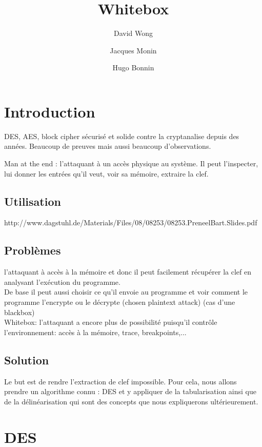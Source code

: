 \documentclass[a4paper,12pt]{article}
\author{David Wong
  \and Jacques Monin
  \and Hugo Bonnin}
\title{Whitebox}
\begin{document}
\maketitle
\newpage
\tableofcontents
\newpage


\section{Introduction}

DES, AES, block cipher sécurisé et solide contre la cryptanalise depuis des années. Beaucoup de preuves mais aussi beaucoup d'observations.

Man at the end : l'attaquant à un accès physique au système. Il peut l'inspecter, lui donner les entrées qu'il veut, voir sa mémoire, extraire la clef.
	
\subsection{Utilisation}

http://www.dagstuhl.de/Materials/Files/08/08253/08253.PreneelBart.Slides.pdf

\subsection{Problèmes}

l'attaquant à accès à la mémoire et donc il peut facilement récupérer la clef en analysant l'exécution du programme.\\
De base il peut aussi choisir ce qu'il envoie au programme et voir comment le programme l'encrypte ou le décrypte (chosen plaintext attack) (cas d'une blackbox)\\
Whitebox: l'attaquant a encore plus de possibilité puisqu'il contrôle l'environnement: accès à la mémoire, trace, breakpoints,...

\subsection{Solution}

Le but est de rendre l'extraction de clef impossible. Pour cela, nous allons prendre un algorithme connu : DES et y appliquer de la tabularisation ainsi que de la délinéarisation qui sont des concepts que nous expliquerons ultérieurement.

\newpage
	
\section{DES}
\end{document}
